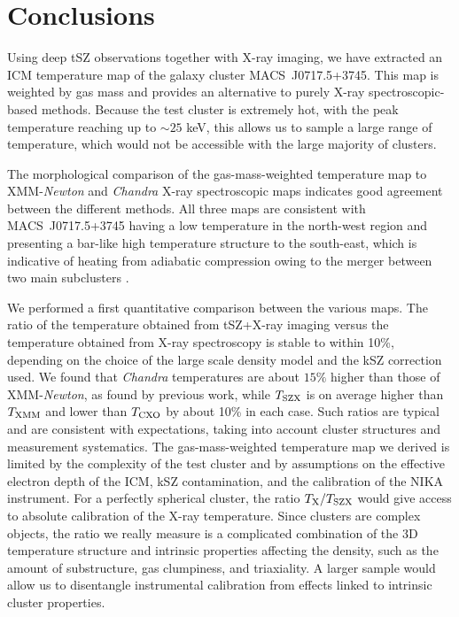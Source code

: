 \documentclass[twocolumn,traditabstract]{aa}
\def\TSZ {T_{\rm SZX}}
\def \TXC {T_{\rm CXO}}
\def \TXX {T_{\rm XMM}}
\begin{document}
\section{Conclusions}\label{sec:conclusions}
Using deep tSZ observations together with X-ray imaging, we have extracted an ICM temperature map of the galaxy cluster \mbox{MACS~J0717.5+3745}. This map is weighted by gas mass and provides an alternative to purely X-ray spectroscopic-based methods. Because the test cluster is extremely hot, with the peak temperature reaching up to $\sim 25$ keV, this allows us to sample a large range of temperature, which would not be accessible with the large majority of clusters.

The morphological comparison of the gas-mass-weighted temperature map to XMM-\textit{Newton} and \textit{Chandra} X-ray spectroscopic maps indicates good agreement between the different methods. All three maps are consistent with \mbox{MACS~J0717.5+3745} having a low temperature in the north-west region and presenting a bar-like high temperature structure to the south-east, which is indicative of heating from adiabatic compression owing to the merger between two main subclusters \citep[see e.g.][]{Ma2009}.

We performed a first quantitative comparison between the various maps. The ratio of the temperature obtained from tSZ+X-ray imaging versus the temperature obtained from X-ray spectroscopy is stable to within 10\%, depending on the choice of the large scale density model and the kSZ correction used. We found that \textit{Chandra} temperatures are about $15\%$ higher than those of XMM-\textit{Newton}, as found by previous work, while $\TSZ$ is on average higher than $\TXX$ and lower than $\TXC$ by about 10\% in each case. Such ratios are typical and are consistent with expectations, taking into account cluster structures and measurement systematics. The gas-mass-weighted temperature map we derived is limited by the complexity of the test cluster and by assumptions on the effective electron depth of the ICM, kSZ contamination, and the calibration of the NIKA instrument. For a perfectly spherical cluster, the ratio $T_{\rm X} / \TSZ$ would give access to absolute calibration of the X-ray temperature. Since clusters are complex objects, the ratio we really measure is a complicated combination of the 3D temperature structure and intrinsic properties affecting the density, such as the amount of substructure, gas clumpiness, and triaxiality. A larger sample would allow us to disentangle instrumental calibration from effects linked to intrinsic cluster properties.
\end{document}
